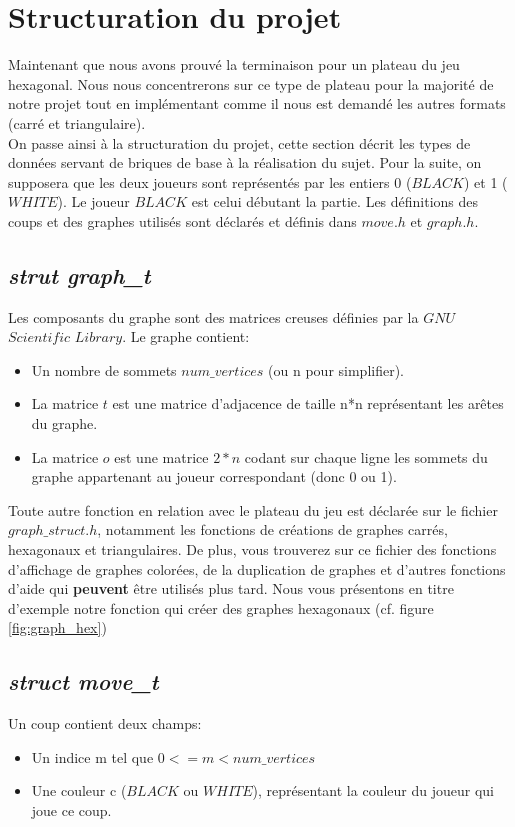 \documentclass{article}
\begin{document}
\section{Structuration du projet}
Maintenant que nous avons prouvé la terminaison pour un plateau du jeu hexagonal. Nous nous concentrerons sur ce type de plateau pour la majorité de notre projet tout en implémentant comme il nous est demandé les autres formats (carré et triangulaire).\\
On passe ainsi à la structuration du projet, cette section décrit les types de données servant de briques de base à la réalisation du sujet. Pour la suite, on supposera que les deux joueurs sont représentés par les entiers 0 ($BLACK$) et 1 ($WHITE$). Le joueur $BLACK$ est celui débutant la partie. Les définitions des coups et des graphes utilisés sont déclarés et définis dans $move.h$  et $graph.h$.
\subsection{\textit{strut graph\_t}}
 Les composants du graphe sont des matrices creuses définies par la $GNU$ $Scientific$ $Library$. Le graphe contient:
 \begin{itemize}
     \item Un nombre de sommets $num\_vertices$ (ou n pour simplifier). 
     \item La matrice $t$ est une matrice d'adjacence de taille n*n représentant les arêtes du graphe.
     \item La matrice $o$ est une matrice $2*n$ codant sur chaque ligne les sommets du graphe appartenant au joueur correspondant (donc 0 ou 1). 
 \end{itemize}
 Toute autre fonction en relation avec le plateau du jeu est déclarée sur le fichier $graph\_struct.h$, notamment les fonctions de créations de graphes carrés, hexagonaux et triangulaires. De plus, vous trouverez sur ce fichier des fonctions d'affichage de graphes colorées, de la duplication de graphes et d'autres fonctions d'aide qui \textbf{peuvent} être utilisés plus tard.  Nous vous présentons en titre d'exemple notre fonction qui créer des graphes hexagonaux (cf. figure \ref{fig:graph_hex})


\subsection{\textit{struct move\_t}}
Un coup contient deux champs:
\begin{itemize}
    \item Un indice m tel que $ 0 <= m < num\_vertices$
    \item Une couleur c ($BLACK$ ou $WHITE$), représentant la couleur du joueur qui joue ce coup.
\end{itemize}
\end{document}
